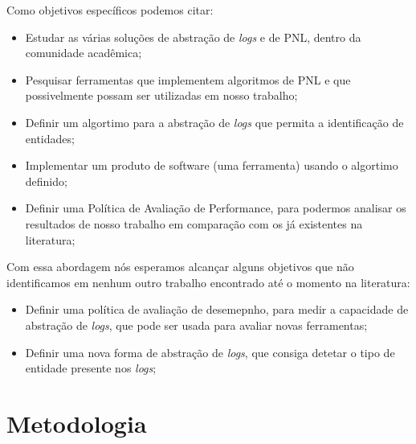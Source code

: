 \documentclass[
	12pt,				%
	openright,			%
	twoside,			%
	a4paper,			%
	english,			%
	spanish,			%
	brazil,				%
	]{abntex2}
\begin{document}
Como objetivos específicos podemos citar:
\begin{itemize}
	\item Estudar as várias soluções de abstração de \emph{logs} e de PNL, dentro da comunidade acadêmica;

	\item Pesquisar ferramentas que implementem algoritmos de PNL e que possivelmente possam ser utilizadas em nosso trabalho;

	\item Definir um algortimo para a abstração de \emph{logs} que permita a identificação de entidades;

	\item Implementar um produto de software (uma ferramenta) usando o algortimo definido;

	\item Definir uma Política de Avaliação de Performance, para podermos analisar os resultados de nosso trabalho em comparação com os já existentes na literatura;

\end{itemize}

Com essa abordagem nós esperamos alcançar alguns objetivos que não identificamos em nenhum outro trabalho encontrado até o momento na literatura:

\begin{itemize}
	\item Definir uma política de avaliação de desemepnho, para medir a capacidade de abstração de \emph{logs}, que pode ser usada para avaliar novas ferramentas;
	\item Definir uma nova forma de abstração de \emph{logs}, que consiga detetar o tipo de entidade presente nos \emph{logs};
\end{itemize}

\section{Metodologia}

%
%
%
%
\end{document}
